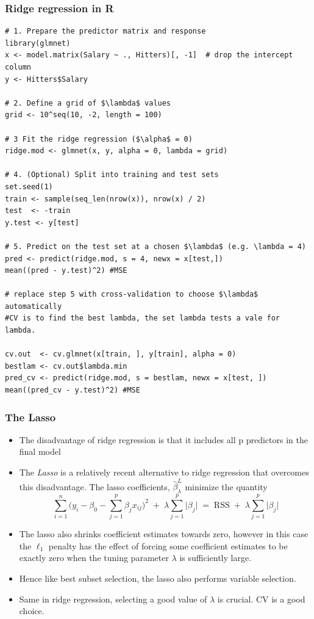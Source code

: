 \documentclass{article}
\begin{document}
\subsubsection{Ridge regression in R}
\begin{lstlisting}
# 1. Prepare the predictor matrix and response
library(glmnet)
x <- model.matrix(Salary ~ ., Hitters)[, -1]  # drop the intercept column
y <- Hitters$Salary

# 2. Define a grid of $\lambda$ values
grid <- 10^seq(10, -2, length = 100)

# 3 Fit the ridge regression ($\alpha$ = 0)
ridge.mod <- glmnet(x, y, alpha = 0, lambda = grid)

# 4. (Optional) Split into training and test sets
set.seed(1)
train <- sample(seq_len(nrow(x)), nrow(x) / 2)
test  <- -train
y.test <- y[test]

# 5. Predict on the test set at a chosen $\lambda$ (e.g. \lambda = 4)
pred <- predict(ridge.mod, s = 4, newx = x[test,])
mean((pred - y.test)^2) #MSE

# replace step 5 with cross-validation to choose $\lambda$ automatically
#CV is to find the best lambda, the set lambda tests a vale for lambda.

cv.out  <- cv.glmnet(x[train, ], y[train], alpha = 0)
bestlam <- cv.out$lambda.min
pred_cv <- predict(ridge.mod, s = bestlam, newx = x[test, ])
mean((pred_cv - y.test)^2) #MSE
\end{lstlisting}


\subsubsection{The Lasso}
\begin{itemize}
    \item The disadvantage of ridge regression is that it includes all p predictors in the final model
    \item The \emph{Lasso} is a relatively recent alternative to ridge regression that overcomes this disadvantage. The lasso coefficients, $\hat{\beta}^L_\lambda$ minimize the quantity
    \begin{equation*}
        \sum_{i=1}^n \biggl(y_i - \beta_0 - \sum_{j=1}^p \beta_j x_{ij}\biggr)^2
    \;+\;\lambda \sum_{j=1}^p \lvert \beta_j \rvert
    \;=\;\mathrm{RSS} \;+\;\lambda \sum_{j=1}^p \lvert \beta_j \rvert
    \end{equation*}
    \item The lasso also shrinks coefficient estimates towards zero, however in this case the $\ell_1$ penalty has the effect of forcing some coefficient estimates to be exactly zero when the tuning parameter $\lambda$ is sufficiently large.
    \item Hence like best subset selection, the lasso also performs variable selection.
    \item Same in ridge regression, selecting a good value of $\lambda$ is crucial. CV is a good choice.
\end{itemize}
\end{document}
